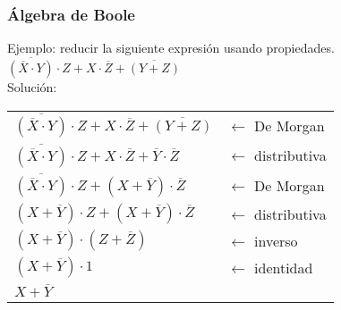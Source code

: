\documentclass[aspectratio=169]{beamer}
\begin{document}
\begin{frame}
\frametitle{Álgebra de Boole}
    Ejemplo: reducir la siguiente expresión usando propiedades.\\
    \vspace{0.5cm}
    $\overline{( \overline{X} \cdot Y )} \cdot Z + X \cdot \overline{Z} + \overline{(Y + Z)}$ \hspace{0.5cm} \\
    \vspace{0.5cm}
    \pause
    Solución: \\
    \vspace{0.5cm}
    \begin{tabular}{ll}
    $ \overline{( \overline{X} \cdot Y )} \cdot Z + X \cdot \overline{Z} + \overline{(Y + Z)} $              & $\longleftarrow$ De Morgan    \\[4pt]\pause
    $ \overline{( \overline{X} \cdot Y )} \cdot Z + X \cdot \overline{Z} + \overline{Y} \cdot \overline{Z} $ & $\longleftarrow$ distributiva \\[4pt]\pause
    $ \overline{( \overline{X} \cdot Y )} \cdot Z + ( X + \overline{Y} ) \cdot \overline{Z}  $                       & $\longleftarrow$ De Morgan    \\[4pt]\pause
    $ ( X + \overline{Y} ) \cdot Z + ( X + \overline{Y} ) \cdot \overline{Z}  $                              & $\longleftarrow$ distributiva \\[4pt]\pause
    $ ( X + \overline{Y} ) \cdot ( Z + \overline{Z} ) $                                                      & $\longleftarrow$ inverso      \\[4pt]\pause
    $ ( X + \overline{Y} ) \cdot 1  $                                                                        & $\longleftarrow$ identidad    \\[4pt]\pause
    $  X + \overline{Y} $
    \end{tabular}
\end{frame}
\end{document}
